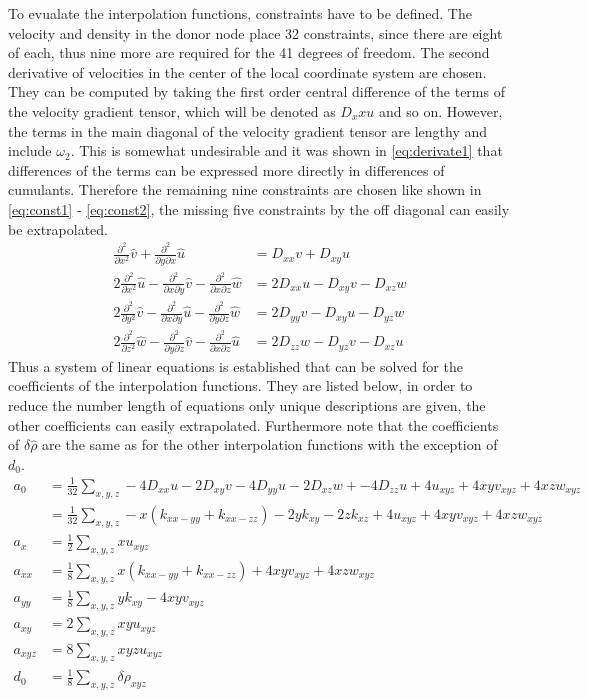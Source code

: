 To evualate the interpolation functions, constraints have to be defined. The velocity and density in the donor node place 32 constraints, since there are eight of each, thus nine more are required for the 41 degrees of freedom. The second derivative of velocities in the center of the local coordinate system are chosen. They can be computed by taking the first order central difference of the terms of the velocity gradient tensor, which will be denoted as $D_xx u$ and so on. However, the terms in the main diagonal of the velocity gradient tensor are lengthy and include $\omega_2$. This is somewhat undesirable and it was shown in \eqref{eq:derivate1} that differences of the terms can be expressed more directly in differences of cumulants. Therefore the remaining nine constraints are chosen like shown in \eqref{eq:const1} - \eqref{eq:const2}, the missing five constraints by the off diagonal can easily be extrapolated. 
\begin{align}
	\frac{\partial^2}{\partial x^2} \hat{v}+\frac{\partial^2}{\partial y \partial x} \hat{u} &= D_{xx} v + D_{xy} u \label{eq:const1} \\
	2\frac{\partial^2}{\partial x^2} \hat{u} - \frac{\partial^2}{\partial x \partial y} \hat{v} - \frac{\partial^2}{\partial x \partial z} \hat{w} &= 2 D_{xx}u- D_{xy}v - D_{xz}w \\
	2\frac{\partial^2}{\partial y^2} \hat{v} - \frac{\partial^2}{\partial x \partial y} \hat{u} - \frac{\partial^2}{\partial y \partial z} \hat{w} &= 2 D_{yy}v- D_{xy}u - D_{yz}w \\
	2\frac{\partial^2}{\partial z^2} \hat{w} - \frac{\partial^2}{\partial y \partial z} \hat{v} - \frac{\partial^2}{\partial x \partial z} \hat{u} &= 2 D_{zz}w- D_{yz}v - D_{xz}u \label{eq:const2}
\end{align}
Thus a system of linear equations is established that can be solved for the coefficients of the interpolation functions. They are listed below, in order to reduce the number length of equations only unique descriptions are given, the other coefficients can easily extrapolated. Furthermore note that the coefficients of $\delta \hat{\rho}$ are the same as for the other interpolation functions with the exception of $d_0$. 
\begin{align}
	a_0 &= \frac{1}{32} \sum_{x,y,z}  -4 D_{xx}u-2 D_{xy}v -4D_{yy}u- 2 D_{xz}w + -4 D_{zz}u + 4 u_{xyz} + 4xyv_{xyz} + 4 xzw_{xyz} \\
	&= \frac{1}{32} \sum_{x,y,z}  -x\left(k_{xx-yy} + k_{xx-zz}\right) - 2yk_{xy} -2zk_{xz} + 4 u_{xyz} + 4xyv_{xyz} + 4 xzw_{xyz} \\
	a_x &= \frac{1}{2} \sum_{x,y,z} x u_{xyz} \\
	a_{xx} &= \frac{1}{8} \sum_{x,y,z}x\left(k_{xx-yy}+k_{xx-zz}\right) + 4xyv_{xyz}+ 4 xzw_{xyz} \\
	a_{yy} &= \frac{1}{8} \sum_{x,y,z}y k_{xy} - 4 xy v_{xyz} \\
	a_{xy} &= 2 \sum_{x,y,z} xyu_{xyz} \\
	a_{xyz} &= 8 \sum_{x,y,z} xyzu_{xyz} \\
	d_0 &= \frac{1}{8} \sum_{x,y,z} \delta \rho_{xyz} 
\end{align}
